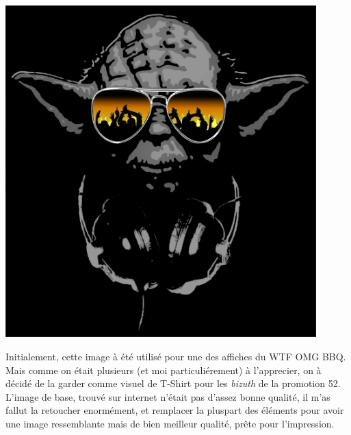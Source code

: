         \begin{center}
            \centering
            \includegraphics[width=0.9\textwidth]{img/yoda-or.jpg}\\
        \end{center}
            Initialement, cette image à été utilisé pour une des affiches du WTF OMG BBQ.
            Mais comme on était plusieurs (et moi particuliérement) à l'apprecier, on à décidé de la garder comme visuel de T-Shirt pour les \emph{bizuth} de la promotion 52.
            L'image de base, trouvé sur internet n'était pas d'assez bonne qualité, il m'as fallut la retoucher enormément, et remplacer la pluspart des éléments pour avoir une image ressemblante mais de bien meilleur qualité, prête pour l'impression.



